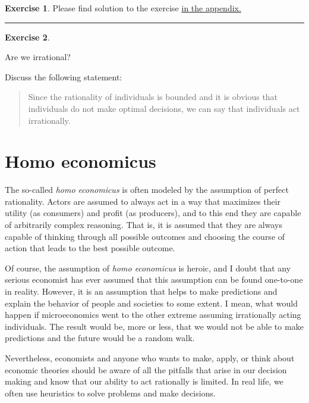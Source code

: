 \documentclass[
  12pt,
  oneside]{book}
\theoremstyle{definition}
\theoremstyle{definition}
\theoremstyle{definition}
\newtheorem{exercise}{Exercise}[chapter]
\theoremstyle{definition}
\theoremstyle{remark}
\begin{document}
\begin{exercise}
Please find solution to the exercise \hyperref[sol:opti-sati]{in the appendix.}

\begin{center}\rule{0.5\linewidth}{0.5pt}\end{center}

\end{exercise}

\begin{exercise}
\protect\hypertarget{exr:irrational}{}\label{exr:irrational}

Are we irrational?

Discuss the following statement:

\begin{quote}
Since the rationality of individuals is bounded and it is obvious that individuals do not make optimal decisions, we can say that individuals act irrationally.
\end{quote}

\end{exercise}

\section{Homo economicus}\label{homo-economicus}

The so-called \emph{homo economicus} is often modeled by the assumption of perfect rationality. Actors are assumed to always act in a way that maximizes their utility (as consumers) and profit (as producers), and to this end they are capable of arbitrarily complex reasoning. That is, it is assumed that they are always capable of thinking through all possible outcomes and choosing the course of action that leads to the best possible outcome.

Of course, the assumption of \emph{homo economicus} is heroic, and I doubt that any serious economist has ever assumed that this assumption can be found one-to-one in reality. However, it is an assumption that helps to make predictions and explain the behavior of people and societies to some extent. I mean, what would happen if microeconomics went to the other extreme assuming irrationally acting individuals. The result would be, more or less, that we would not be able to make predictions and the future would be a random walk.

Nevertheless, economists and anyone who wants to make, apply, or think about economic theories should be aware of all the pitfalls that arise in our decision making and know that our ability to act rationally is limited. In real life, we often use heuristics to solve problems and make decisions.
\end{document}
